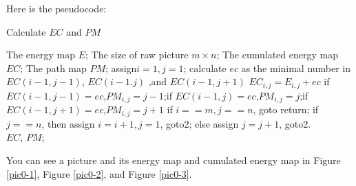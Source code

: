 \documentclass[final]{cvpr}
\begin{document}
Here is the pseudocode:
\begin{algorithm}[htb]  
  \caption{Calculate $EC$ and $PM$}  
  \begin{algorithmic}[1]  
    \Require
    The energy map $E$;
    The size of raw picture $m\times n$;
    \Ensure  
    The cumulated energy map $EC$; 
    The path map $PM$;
    \State assign$i=1,j=1$;  
    \State calculate $ec$ as the minimal number in $EC(i-1,j-1)$, $EC(i-1.j)$ ,and $EC(i-1,j+1)$
    \State $EC_{i,j}=E_{i,j}+ec$ 
    \State if $EC(i-1,j-1)=ec$,$PM_{i,j}=j-1$;if $EC(i-1,j)=ec$,$PM_{i,j}=j$;if $EC(i-1,j+1)=ec$,$PM_{i,j}=j+1$ 
    \State if $i==m,j==n$, goto return; if $j==n$, then assign $i=i+1,j=1$, goto2; else assign $j=j+1$, goto2.\\
    \Return $EC$, $PM$;
  \end{algorithmic}  
\end{algorithm}

You can see a picture and its energy map and cumulated energy map in Figure \ref{pic0-1}, Figure \ref{pic0-2}, and Figure \ref{pic0-3}.
\end{document}
